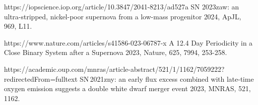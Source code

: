 \begin{cvpubs}
{\begin{cvitems}
    {\Cliu}
    {https://iopscience.iop.org/article/10.3847/2041-8213/ad527a}
    {SN 2023zaw: an ultra-stripped, nickel-poor supernova from a low-mass progenitor}
    {2024, ApJL, 969, L11.}
    \item {} 
    {\Cliu}
    {https://www.nature.com/articles/s41586-023-06787-x}
    {A 12.4 Day Periodicity in a Close Binary System after a Supernova}
    {2023, Nature, 625, 7994, 253-258.}
    \item {} 
    {\Cliu}
    {https://academic.oup.com/mnras/article-abstract/521/1/1162/7059222?redirectedFrom=fulltext}
    {SN\,2021zny: an early flux excess combined with late-time oxygen emission suggests a double white dwarf merger event}
    {2023, MNRAS, 521, 1162.}
\end{cvitems}
}


\end{cvpubs}





